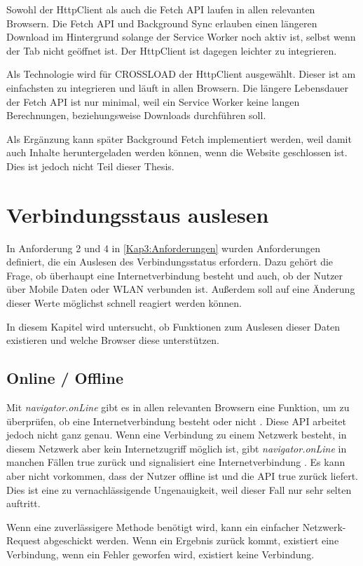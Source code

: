 Sowohl der HttpClient als auch die Fetch \ac{API} laufen in allen relevanten Browsern. Die Fetch \ac{API} und Background Sync erlauben einen längeren Download im Hintergrund solange der Service Worker noch aktiv ist, selbst wenn der Tab nicht geöffnet ist. Der HttpClient ist dagegen leichter zu integrieren.

Als Technologie wird für CROSSLOAD der HttpClient ausgewählt. Dieser ist am einfachsten zu integrieren und läuft in allen Browsern. Die längere Lebensdauer der Fetch \ac{API} ist nur minimal, weil ein Service Worker keine langen Berechnungen, beziehungsweise Downloads durchführen soll.

Als Ergänzung kann später Background Fetch implementiert werden, weil damit auch Inhalte heruntergeladen werden können, wenn die Website geschlossen ist. Dies ist jedoch nicht Teil dieser Thesis.

\section{Verbindungsstaus auslesen}
In Anforderung 2 und 4 in \autoref{Kap3:Anforderungen} wurden Anforderungen definiert, die ein Auslesen des Verbindungsstatus erfordern. Dazu gehört die Frage, ob überhaupt eine Internetverbindung besteht und auch, ob der Nutzer über Mobile Daten oder WLAN verbunden ist. Außerdem soll auf eine Änderung dieser Werte möglichst schnell reagiert werden können.

In diesem Kapitel wird untersucht, ob Funktionen zum Auslesen dieser Daten existieren und welche Browser diese unterstützen. 

\subsection{Online / Offline}
Mit \emph{navigator.onLine} gibt es in allen relevanten Browsern \autocite{caniuse-online} eine Funktion, um zu überprüfen, ob eine Internetverbindung besteht oder nicht \autocite{Sheppard2017} \autocite{mdn-online}. Diese \ac{API} arbeitet jedoch nicht ganz genau. Wenn eine Verbindung zu einem Netzwerk besteht, in diesem Netzwerk aber kein Internetzugriff möglich ist, gibt \emph{navigator.onLine} in manchen Fällen true zurück und signalisiert eine Internetverbindung \autocite{Sheppard2017}. Es kann aber nicht vorkommen, dass der Nutzer offline ist und die \ac{API} true zurück liefert. Dies ist eine zu vernachlässigende Ungenauigkeit, weil dieser Fall nur sehr selten auftritt. 

Wenn eine zuverlässigere Methode benötigt wird, kann ein einfacher Netzwerk-Request abgeschickt werden. Wenn ein Ergebnis zurück kommt, existiert eine Verbindung, wenn ein Fehler geworfen wird, existiert keine Verbindung. 

